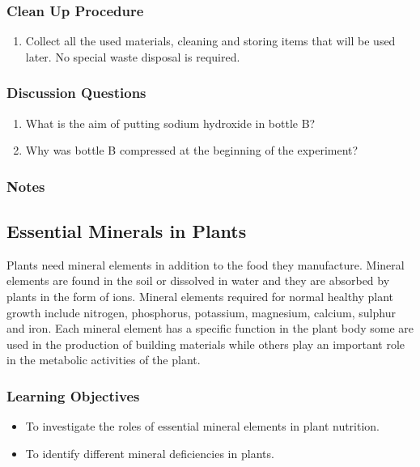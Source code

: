\subsubsection*{Clean Up Procedure}
\begin{enumerate}
\item{Collect all the used materials, cleaning and storing items that will be used later. No special waste disposal is required.}
\end{enumerate}

\subsubsection*{Discussion Questions}
\begin{enumerate}
\item{What is the aim of putting sodium hydroxide in bottle B?}
\item{Why was bottle B compressed at the beginning of the experiment?}
\end{enumerate}

\subsubsection*{Notes}

\subsection{Essential Minerals in Plants}
Plants need mineral elements in addition to the food they manufacture. Mineral elements are found in the soil or dissolved in water and they are absorbed by plants in the form of ions. Mineral elements required for normal healthy plant growth include nitrogen, phosphorus, potassium, magnesium, calcium, sulphur and iron. Each mineral element has a specific function in the plant body some are used in the production of building materials while others play an important role in the metabolic activities of the plant.

\subsubsection*{Learning Objectives}
\begin{itemize}
\item{To investigate the roles of essential mineral elements in plant nutrition.}
\item{To identify different mineral deficiencies in plants.}
\end{itemize}


